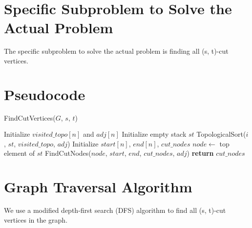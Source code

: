 \documentclass{article}
\begin{document}
\section{Specific Subproblem to Solve the Actual Problem}
The specific subproblem to solve the actual problem is finding all (s, t)-cut vertices.
    
\section{Pseudocode}
\begin{algorithm}
    \caption{FindCutVertices($G$, $s$, $t$)}
    \begin{algorithmic}[1]
        \State Initialize $visited\_topo[n]$ and $adj[n]$
        \State Initialize empty stack $st$
                \State TopologicalSort($i$, $st$, $visited\_topo$, $adj$)
            \EndIf
        \EndFor
        \State Initialize $start[n]$, $end[n]$, $cut\_nodes$
            \State $node \gets$ top element of $st$
                \State FindCutNodes($node$, $start$, $end$, $cut\_nodes$, $adj$)
            \EndIf
        \EndWhile
        \State \textbf{return} $cut\_nodes$
    \end{algorithmic}
\end{algorithm}

\section{Graph Traversal Algorithm}
We use a modified depth-first search (DFS) algorithm to find all (s, t)-cut vertices in the graph.
\end{document}
